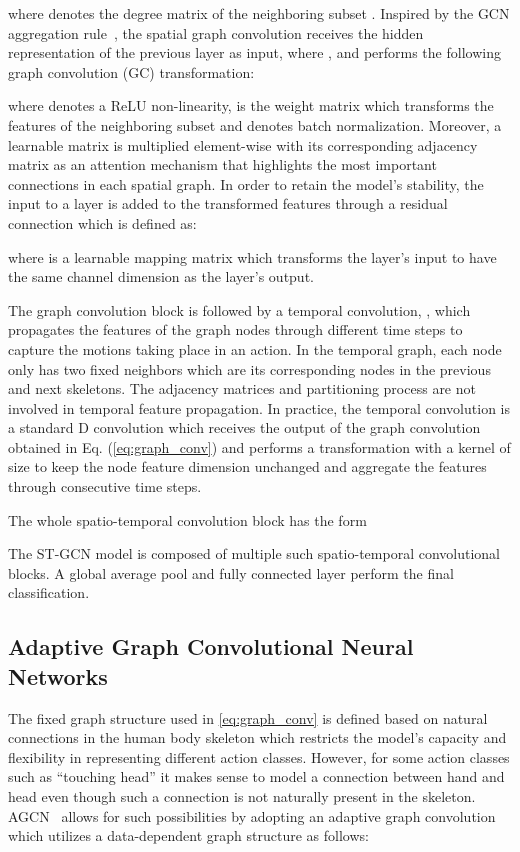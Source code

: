 \documentclass[journal]{IEEEtran}
\theoremstyle{definition}
\begin{document}
where  denotes the degree matrix of the neighboring subset . 
Inspired by the GCN aggregation rule~\cite{kipf2016semi}, the spatial graph convolution receives the hidden representation of the previous layer  as input, where , and performs the following graph convolution (GC) transformation:

where  denotes a ReLU non-linearity,  is the weight matrix which transforms the features of the neighboring subset  and  denotes batch normalization. Moreover, a learnable matrix  is multiplied element-wise with its corresponding adjacency matrix  as an attention mechanism that highlights the most important connections in each spatial graph. 
In order to retain the model's stability, the input to a layer is added to the transformed features through a residual connection  which is defined as:

where  is a learnable mapping matrix which transforms the layer's input to have the same channel dimension as the layer's output.

The graph convolution block is followed by a temporal convolution, , which propagates the features of the graph nodes through different time steps to capture the motions taking place in an action. 
In the temporal graph, each node only has two fixed neighbors which are its corresponding nodes in the previous and next skeletons. The adjacency matrices and partitioning process are not involved in temporal feature propagation.
In practice, the temporal convolution is a standard D convolution which receives the output of the graph convolution obtained in Eq. (\ref{eq:graph_conv}) and performs a transformation with a kernel of size  to keep the node feature dimension unchanged and aggregate the features through  consecutive time steps. 

The whole spatio-temporal convolution block has the form

The ST-GCN model is composed of multiple such spatio-temporal convolutional blocks. A global average pool and fully connected layer perform the final classification.

\subsection{Adaptive Graph Convolutional Neural Networks}
The fixed graph structure used in \cref{eq:graph_conv} is defined based on natural connections in the human body skeleton which restricts the model's capacity and flexibility in representing different action classes. However, for  some action classes such as ``touching head'' it makes sense to model a connection between hand and head even though such a connection is not naturally present in the skeleton. AGCN~\cite{shi2019two} allows for such possibilities by adopting an adaptive graph convolution which utilizes a data-dependent graph structure as follows:
\end{document}
